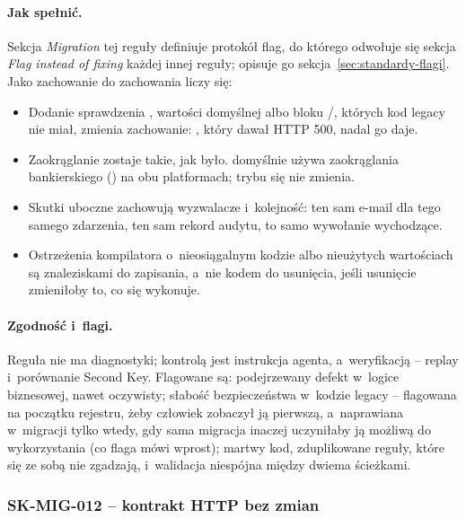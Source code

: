 \paragraph{Jak spełnić.} Sekcja \emph{Migration} tej reguły definiuje protokół flag, do
którego odwołuje się sekcja \emph{Flag instead of fixing} każdej innej reguły; opisuje go
sekcja~\ref{sec:standardy-flagi}. Jako zachowanie do zachowania liczy się:
\begin{itemize}
  \item Dodanie sprawdzenia , wartości domyślnej albo bloku
        /, których kod legacy nie miał, zmienia zachowanie:
        , który dawał HTTP 500, nadal go daje.
  \item Zaokrąglanie zostaje takie, jak było.  domyślnie używa
        zaokrąglania bankierskiego () na obu platformach;
        trybu się nie zmienia.
  \item Skutki uboczne zachowują wyzwalacze i~kolejność: ten sam e-mail dla tego samego
        zdarzenia, ten sam rekord audytu, to samo wywołanie wychodzące.
  \item Ostrzeżenia kompilatora o~nieosiągalnym kodzie albo nieużytych wartościach są
        znaleziskami do zapisania, a~nie kodem do usunięcia, jeśli usunięcie zmieniłoby to,
        co się wykonuje.
\end{itemize}

\paragraph{Zgodność i~flagi.} Reguła nie ma diagnostyki; kontrolą jest instrukcja agenta,
a~weryfikacją -- replay i~porównanie Second Key. Flagowane są: podejrzewany defekt w~logice
biznesowej, nawet oczywisty; słabość bezpieczeństwa w~kodzie legacy -- flagowana na początku
rejestru, żeby człowiek zobaczył ją pierwszą, a~naprawiana w~migracji tylko wtedy, gdy sama
migracja inaczej uczyniłaby ją możliwą do wykorzystania (co flaga mówi wprost); martwy kod,
zduplikowane reguły, które się ze sobą nie zgadzają, i~walidacja niespójna między dwiema
ścieżkami.


\subsubsection{SK-MIG-012 -- kontrakt HTTP bez zmian}\label{sec:standardy-sk-mig-012}

